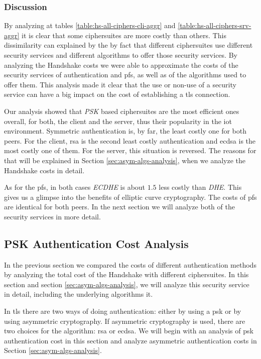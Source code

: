 \subsubsection{Discussion}

By analyzing at tables \ref{table:hs-all-ciphers-cli-aggr}
and \ref{table:hs-all-ciphers-srv-aggr} it is clear that some ciphersuites are more costly than others. This dissimilarity
can explained by the by fact that different ciphersuites use different security services and different algorithms to
offer those security services. By analyzing the Handshake costs we were able to approximate the costs of the security
services of authentication and \gls{pfs}, as well as of the algorithms used to offer them. This analysis made it clear that the
use or non-use of a security service can have a big impact on the cost of establishing a \gls{tls} connection.

Our analysis showed that \textit{PSK} based ciphersuites are the most efficient ones overall, for both, the client
and the server, thus their popularity in the \gls{iot} environment. Symmetric authentication is, by far,
the least costly one for both peers. For the client, \gls{rsa} is the second least costly authentication and \gls{ecdsa}
is the most costly one of them. For the server, this situation is reversed. The reasons for that will be explained in
Section \ref{sec:asym-algs-analysis}, when we analyze the Handshake costs in detail.

As for the \gls{pfs}, in both cases \textit{ECDHE} is about $1.5$ less costly than \textit{DHE}. This gives us a glimpse
into the benefits of elliptic curve cryptography. The costs of \gls{pfs} are identical for both peers. In the next
section we will analyze both of the security services in more detail.

\subsection{PSK Authentication Cost Analysis} \label{sec:psk-cost-analysis}

In the previous section we compared the costs of different authentication methods by analyzing the total cost of the
Handshake with different ciphersuites. In this section and section \ref{sec:asym-algs-analysis}, we will analyze this 
security service in detail, including the underlying algorithms it. 

In \gls{tls} there are two ways of doing authentication: either by using a \gls{psk} or by using asymmetric cryptography.
If asymmetric cryptography is used, there are two choices for the algorithm: \gls{rsa} or \gls{ecdsa}. We will begin 
with an analysis of \gls{psk} authentication cost in this section and analyze asymmetric authentication costs 
in Section \ref{sec:asym-algs-analysis}.

